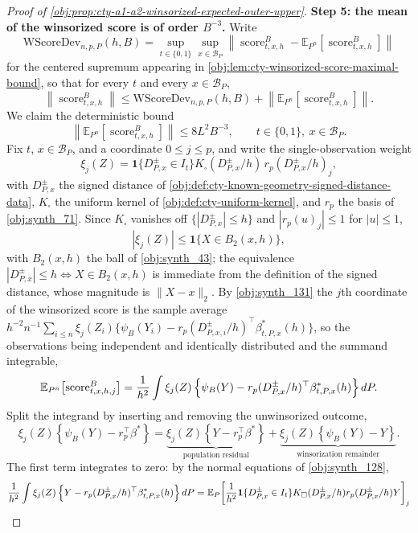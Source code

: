 \begin{proof}[Proof of \cref{obj:prop:cty-a1-a2-winsorized-expected-outer-upper}]
\textbf{Step 5: the mean of the winsorized score is of order \(B^{-3}\).}  Write
\[
\mathrm{WScoreDev}_{n,p,P}(h,B)
=
\sup_{t\in\{0,1\}}\sup_{x\in\mathcal B_P}
\left\lVert
\operatorname{score}^{B}_{t,x,h}
-\mathbb E_{P^n}\!\left[\operatorname{score}^{B}_{t,x,h}\right]
\right\rVert
\]
for the centered supremum appearing in \cref{obj:lem:cty-winsorized-score-maximal-bound}, so that for every \(t\) and every \(x\in\mathcal B_P\),
\[
\left\lVert\operatorname{score}^{B}_{t,x,h}\right\rVert
\leq
\mathrm{WScoreDev}_{n,p,P}(h,B)
+
\left\lVert\mathbb E_{P^n}\!\left[\operatorname{score}^{B}_{t,x,h}\right]\right\rVert .
\]
We claim the deterministic bound
\[
\left\lVert\mathbb E_{P^n}\!\left[\operatorname{score}^{B}_{t,x,h}\right]\right\rVert
\leq
8L^2B^{-3},
\qquad t\in\{0,1\},\ x\in\mathcal B_P .
\]
Fix \(t\), \(x\in\mathcal B_P\), and a coordinate \(0\leq j\leq p\), and write the single-observation weight
\[
\xi_j(Z)
=
\mathbf 1\{D^{\pm}_{P,x}\in I_t\}
K_\square(D^{\pm}_{P,x}/h)\,
r_p(D^{\pm}_{P,x}/h)_j ,
\]
with \(D^{\pm}_{P,x}\) the signed distance of \cref{obj:def:cty-known-geometry-signed-distance-data}, \(K_\square\) the uniform kernel of \cref{obj:def:cty-uniform-kernel}, and \(r_p\) the basis of \cref{obj:synth_71}.  Since \(K_\square\) vanishes off \(\{|D^{\pm}_{P,x}|\leq h\}\) and \(|r_p(u)_j|\leq1\) for \(|u|\leq1\),
\[
|\xi_j(Z)|\leq\mathbf 1\{X\in B_2(x,h)\} ,
\]
with \(B_2(x,h)\) the ball of \cref{obj:synth_43}; the equivalence \(|D^{\pm}_{P,x}|\leq h\iff X\in B_2(x,h)\) is immediate from the definition of the signed distance, whose magnitude is \(\lVert X-x\rVert_2\).  By \cref{obj:synth_131} the \(j\)th coordinate of the winsorized score is the sample average \(h^{-2}n^{-1}\sum_{i\leq n}\xi_j(Z_i)\{\psi_B(Y_i)-r_p(D^{\pm}_{P,x,i}/h)^\top\beta^*_{t,P,x}(h)\}\), so the observations being independent and identically distributed and the summand integrable,
\[
\mathbb E_{P^n}\!\left[\operatorname{score}^{B}_{t,x,h,j}\right]
=
{1\over h^2}\int
\xi_j(Z)\left\{\psi_B(Y)-r_p(D^{\pm}_{P,x}/h)^\top\beta^*_{t,P,x}(h)\right\}dP .
\]
Split the integrand by inserting and removing the unwinsorized outcome,
\[
\xi_j(Z)\left\{\psi_B(Y)-r_p^\top\beta^*\right\}
=
\underbrace{\xi_j(Z)\left\{Y-r_p^\top\beta^*\right\}}_{\text{population residual}}
+
\underbrace{\xi_j(Z)\left\{\psi_B(Y)-Y\right\}}_{\text{winsorization remainder}} .
\]
The first term integrates to zero: by the normal equations of \cref{obj:synth_128},
\[
{1\over h^2}\int\xi_j(Z)\left\{Y-r_p(D^{\pm}_{P,x}/h)^\top\beta^*_{t,P,x}(h)\right\}dP
=
\mathbb E_P\!\left[{1\over h^2}\mathbf 1\{D^{\pm}_{P,x}\in I_t\}K_\square(D^{\pm}_{P,x}/h)r_p(D^{\pm}_{P,x}/h)Y\right]_j
\]
\end{proof}
